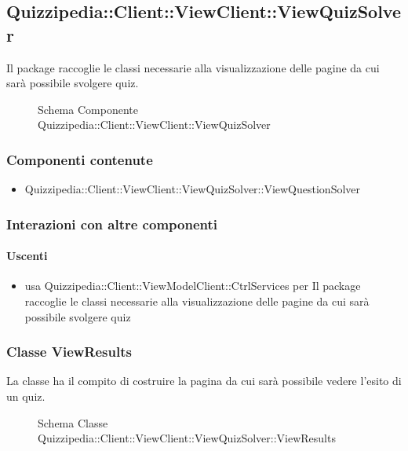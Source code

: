 \subsection{Quizzipedia::Client::ViewClient::ViewQuizSolver}
Il package raccoglie le classi necessarie alla visualizzazione delle pagine da cui sarà possibile svolgere quiz.
\begin{figure}[H]
\centering
\noindent{}
\caption[Schema Componente Quizzipedia::Client::ViewClient::ViewQuizSolver]{Schema Componente Quizzipedia::Client::ViewClient::ViewQuizSolver}
\end{figure}
\subsubsection{Componenti contenute}
\begin{itemize}
\item Quizzipedia::Client::ViewClient::ViewQuizSolver::ViewQuestionSolver
\end{itemize}
\subsubsection{Interazioni con altre componenti}
\paragraph{Uscenti}
\begin{itemize}
\item usa Quizzipedia::Client::ViewModelClient::CtrlServices per Il package raccoglie le classi necessarie alla visualizzazione delle pagine da cui sarà possibile svolgere quiz
\end{itemize}
\subsubsection{Classe ViewResults}
La classe ha il compito di costruire la pagina da cui sarà possibile vedere l'esito di un quiz.
\begin{figure}[H]
\centering
\noindent{}
\caption[Schema Classe ViewResults]{Schema Classe Quizzipedia::Client::ViewClient::ViewQuizSolver::ViewResults}
\end{figure}
